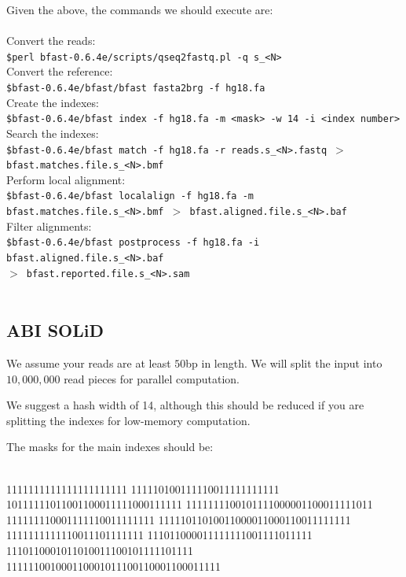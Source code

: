 \documentclass[a4paper,12pt]{book}
\newcommand{\Version}{0.6.4e}
\begin{document}
Given the above, the commands we should execute are:
\\\\
Convert the reads:\\
{\tt \scriptsize \$perl bfast-\Version{}/scripts/qseq2fastq.pl -q s\_<N>\\}
Convert the reference:\\
{\tt \scriptsize \$bfast-\Version{}/bfast/bfast fasta2brg -f hg18.fa\\}
Create the indexes:\\
{\tt \scriptsize \$bfast-\Version{}/bfast index -f hg18.fa -m <mask> -w 14 -i <index number>\\}
Search the indexes:\\
{\tt \scriptsize \$bfast-\Version{}/bfast match -f hg18.fa -r reads.s\_<N>.fastq $>$ bfast.matches.file.s\_<N>.bmf\\}
Perform local alignment:\\
{\tt \scriptsize \$bfast-\Version{}/bfast localalign -f hg18.fa -m bfast.matches.file.s\_<N>.bmf $>$ bfast.aligned.file.s\_<N>.baf\\}
Filter alignments:\\
{\tt \scriptsize \$bfast-\Version{}/bfast postprocess -f hg18.fa -i bfast.aligned.file.s\_<N>.baf\\
$>$ bfast.reported.file.s\_<N>.sam\\}
\\

\subsection{ABI SOLiD}
\label{sec:hg-settings-abi}
We assume your reads are at least $50$bp in length.
We will split the input into $10,000,000$ read pieces for parallel computation.

We suggest a hash width of 14, although this should be reduced if you are splitting the indexes for low-memory computation.

The masks for the main indexes should be:\\
\\
\begin{boxedverbatim}
1111111111111111111111
111110100111110011111111111
10111111011001100011111000111111
1111111100101111000001100011111011
111111110001111110011111111
11111011010011000011000110011111111
1111111111110011101111111
111011000011111111001111011111
1110110001011010011100101111101111
111111001000110001011100110001100011111
\end{boxedverbatim}
\\
\end{document}
